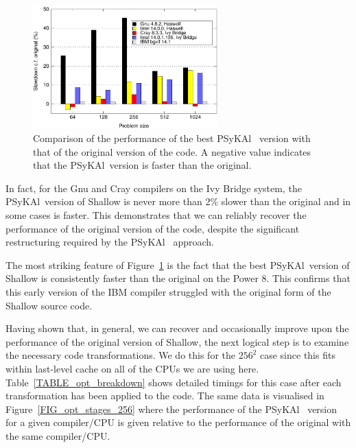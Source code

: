 \documentclass[journal]{IEEEtran}
\newcommand{\psykal}{{PS}y{KA}l\ }
\begin{document}
\begin{figure}[!t]
\centering
\includegraphics[width=2.8in]{slowdown_summary}
\caption{Comparison of the performance of the best \psykal
version with that of the original version of the code. A negative value 
indicates that the \psykal version is faster than the original.}
\label{FIG_slowdown_summary}
\end{figure}

In fact, for the Gnu and Cray compilers on the Ivy Bridge system, the
\psykal version of Shallow is never more than 2\% slower than the
original and in some cases is faster.  This demonstrates that we can
reliably recover the performance of the original version of the code,
despite the significant restructuring required by the \psykal
approach.

The most striking feature of Figure~\ref{FIG_slowdown_summary} is the
fact that the best \psykal version of Shallow is consistently faster
than the original on the Power 8. This confirms that this early
version of the IBM compiler struggled with the original form of the
Shallow source code.

Having shown that, in general, we can recover and occasionally improve
upon the performance of the original version of Shallow, the next
logical step is to examine the necessary code transformations.  We do
this for the $256^{2}$ case since this fits within last-level cache on
all of the CPUs we are using here.  Table~\ref{TABLE_opt_breakdown}
shows detailed timings for this case after each transformation has
been applied to the code. The same data is visualised in
Figure~\ref{FIG_opt_stages_256} where the performance of the \psykal
version for a given compiler/CPU is given relative to the performance
of the original with the same compiler/CPU.
\end{document}
